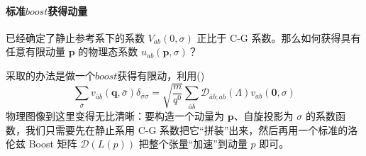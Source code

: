 \paragraph*{标准$boost$获得动量}
\medskip
已经确定了静止参考系下的系数 $V_{ab}(0, \sigma)$ 正比于 C-G 系数。那么如何获得具有任意有限动量 $\boldsymbol{p}$ 的物理态系数 $u_{ab}(\boldsymbol{p}, \sigma)$？ 

采取的办法是做一个$boost$获得有限动，利用()
\begin{equation}
  \sum_{\bar{\sigma}}v_{\bar{a}\bar{b}}( \boldsymbol{q},\bar{\sigma})\delta_{\bar{\sigma}\sigma}=\sqrt{\frac{m}{q^0}}\sum_{\bar{a}\bar{b}}\mathscr{D}_{\bar{a}\bar{b};ab}(\Lambda)v_{ab}(\boldsymbol{0},\sigma)
\end{equation}
物理图像到这里变得无比清晰：\color{blue}要构造一个动量为 $\boldsymbol{p}$、自旋投影为 $\sigma$ 的系数函数，我们只需要先在静止系用 C-G 系数把它“拼装”出来，然后再用一个标准的洛伦兹 Boost 矩阵 $\mathscr{D}(L(p))$ 把整个张量“加速”到动量 $p$ 即可。\normalcolor


